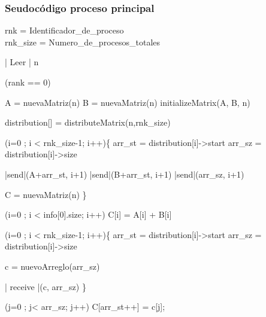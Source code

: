 \documentclass{article}
\begin{document}
\subsubsection{Seudocódigo proceso principal}

\begin{program}
    rnk = Identificador\_de\_proceso\\
    rnk\_size = Numero\_de\_procesos\_totales

    | Leer | n 

    \IF(rank == 0)\ 

    A = nuevaMatriz(n) 
    B = nuevaMatriz(n) 
    initializeMatrix(A, B, n) 
\end{program}

\begin{program}
    distribution[] = distributeMatrix(n,rnk\_size)
\end{program}

\begin{program}
    \FOR (i=0 ; i < rnk\_size-1; i++)\{  
    arr\_st = distribution[i]->start
    arr\_sz = distribution[i]->size

    |send|(A+arr\_st, i+1) 
    |send|(B+arr\_st, i+1) 
    |send|(arr\_sz, i+1)

    C = nuevaMatriz(n) 
    \}
\end{program}

\begin{program}
    \FOR (i=0 ; i < info[0].size; i++)
    C[i] = A[i] + B[i]
\end{program}

\begin{program}
    \FOR (i=0 ; i < rnk\_size-1; i++)\{  
    arr\_st = distribution[i]->start
    arr\_sz = distribution[i]->size

    c = nuevoArreglo(arr\_sz)

    | receive |(c, arr\_sz) 
    \}
\end{program}

\begin{program}
    \FOR (j=0 ; j< arr\_sz; j++)
    C[arr\_st++] = c[j];
\end{program}
\end{document}
